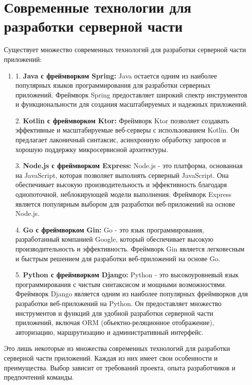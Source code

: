 \section{Современные технологии для разработки серверной части}
Существует множество современных технологий для разработки серверной части приложений:

\begin{enumerate}
    \item 1. \textbf{Java с фреймворком Spring:} Java остается одним из наиболее популярных языков программирования для разработки серверных приложений. 
    Фреймворк Spring предоставляет широкий спектр инструментов и функциональности для создания масштабируемых и надежных приложений. 

    2. \textbf{Kotlin с фреймворком Ktor:} Фреймворк Ktor позволяет создавать эффективные и масштабируемые веб-серверы с использованием Kotlin. 
    Он предлагает лаконичный синтаксис, асинхронную обработку запросов и хорошую поддержку микросервисной архитектуры.
    
    3. \textbf{Node.js с фреймворком Express:} Node.js - это платформа, основанная на JavaScript, которая позволяет выполнять серверный JavaScript. 
    Она обеспечивает высокую производительность и эффективность благодаря однопоточной, неблокирующей модели выполнения. 
    Фреймворк Express является популярным выбором для разработки веб-приложений на основе Node.js.
    
    4. \textbf{Go с фреймворком Gin:} Go - это язык программирования, разработанный компанией Google, 
    который обеспечивает высокую производительность и эффективность. 
    Фреймворк Gin является легковесным и быстрым решением для разработки веб-приложений на основе Go. 
    
    5. \textbf{Python с фреймворком Django:} Python - это высокоуровневый язык программирования с чистым синтаксисом и мощными возможностями. 
    Фреймворк Django является одним из наиболее популярных фреймворков для разработки веб-приложений на Python. 
    Он предоставляет множество инструментов и функций для удобной разработки серверной части приложений, 
    включая ORM (объектно-реляционное отображение), авторизацию, маршрутизацию и административный интерфейс.
\end{enumerate}

Это лишь некоторые из множества современных технологий для разработки серверной части приложений.
Каждая из них имеет свои особенности и преимущества. 
Выбор зависит от требований проекта, опыта разработчиков и предпочтений команды.

